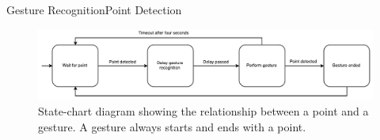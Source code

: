 \begin{frame}{Gesture Recognition}{Point Detection}
\centering
\begin{figure}
    \includegraphics[width=\textwidth]{../images/point-to-gesture-state-diagram}
    \caption{State-chart diagram showing the relationship between a point and a gesture. A gesture always starts and ends with a point.}
\label{fig:point-to-gesture-state-diagram}
\end{figure}
\end{frame}